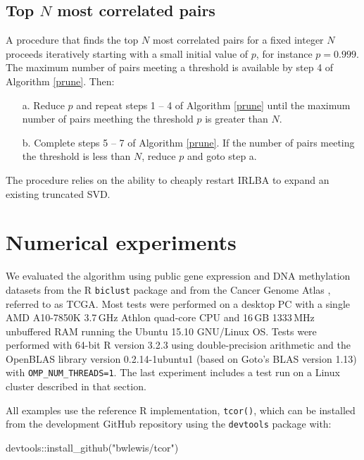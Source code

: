 \documentclass{article}
\let\proglang=\textsf
\numberwithin{algorithmctr}{section}
\begin{document}
\subsection{Top $N$ most correlated pairs}

A procedure that finds the top $N$ most correlated pairs for a fixed integer
$N$ proceeds iteratively starting with a small initial value of $p$, for
instance $p = 0.999$.  The maximum number of pairs meeting a
threshold is available by step 4 of Algorithm \ref{prune}.  Then:

\begin{enumerate}
\item[a.] Reduce $p$ and repeat steps 1 -- 4 of Algorithm \ref{prune} until
the maximum number of pairs meething the threshold $p$ is greater than $N$.
\item[b.] Complete steps 5 -- 7 of Algorithm \ref{prune}. If the number of
pairs meeting the threshold is less than $N$, reduce $p$ and goto step a.
\end{enumerate}

The procedure relies on the ability to cheaply restart IRLBA to expand an
existing truncated SVD.



\section{Numerical experiments}\label{examples}


We evaluated the algorithm using public gene expression and DNA methylation
datasets from the \proglang{R} {\tt biclust} \cite{biclust} package and from
the Cancer Genome Atlas \cite{gdac}, referred to as TCGA.  Most tests were
performed on a desktop PC with a single AMD A10-7850K 3.7$\,$GHz Athlon
quad-core CPU and 16$\,$GB 1333$\,$MHz unbuffered RAM running the Ubuntu 15.10
GNU/Linux OS. Tests were performed with 64-bit \proglang{R} version 3.2.3 using
double-precision arithmetic and the OpenBLAS library version 0.2.14-1ubuntu1
(based on Goto's BLAS version 1.13) with {\tt OMP\_NUM\_THREADS=1}. The last
experiment includes a test run on a Linux cluster described in that section.

All examples use the reference \proglang{R} implementation, {\tt tcor()}, which can be
installed from the development GitHub repository using the
{\tt devtools} package with:

\begin{Schunk}
\begin{Sinput}
devtools::install_github("bwlewis/tcor")
\end{Sinput}
\end{Schunk}
\end{document}
